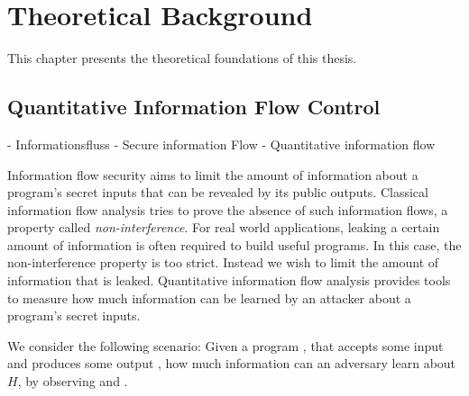 \chapter{Theoretical Background}\label{sec:basics}

This chapter presents the theoretical foundations of this thesis. 

\section{Quantitative Information Flow Control}

- Informationsfluss
- Secure information Flow
- Quantitative information flow


Information flow security aims to limit the amount of information about a program's secret inputs that can be revealed by its public outputs. Classical information flow analysis tries to prove the absence of such information flows, a property called \emph{non-interference}.
For real world applications, leaking a certain amount of information is often required to build useful programs. In this case, the non-interference property is too strict. Instead we wish to limit the amount of information that is leaked.
Quantitative information flow analysis provides tools to measure how much information can be learned by an attacker about a program's secret inputs.



We consider the following scenario: Given a program \p, that accepts some input \In and produces some output \Out, how much information can an adversary \A learn about $H$, by observing \p and \Out.

